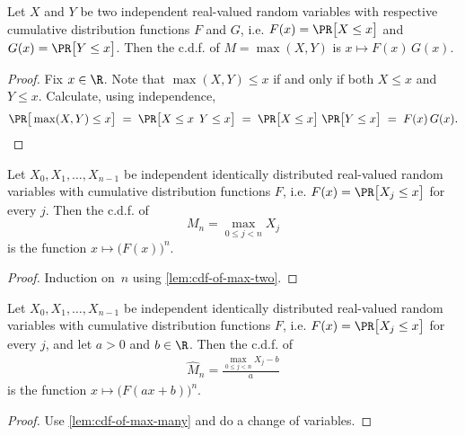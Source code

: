 \begin{lemma}
  \label{lem:cdf-of-max-two}
  Let $X$ and $Y$ be two independent real-valued random variables with respective
  cumulative distribution functions $F$ and $G$,
  i.e. $F(x) = \PR \big[ X \le x \big]$ and $G(x) = \PR \big[ Y \le x \big]$.
  Then the c.d.f. of $M = \max (X, Y)$ is $x \mapsto F(x) \, G(x)$.
\end{lemma}
\begin{proof}
  \uses{}
  Fix $x \in \R$. Note that $\max (X, Y) \le x$ if and only if both $X \le x$ and $Y \le x$.
  Calculate, using independence,
  \begin{align*}
  \PR\big[ \max (X, Y) \le x \big]
  \; = \; \PR\big[ X \le x \, \; Y \le x \big]
  \; = \; \PR\big[ X \le x \big] \; \PR\big[ Y \le x \big]
  \; = \; F(x) \, G(x) .
  \end{align*}
\end{proof}

\begin{lemma}
  \label{lem:cdf-of-max-many}
  Let $X_0, X_1, \ldots, X_{n-1}$ be independent identically distributed real-valued random variables
  with cumulative distribution functions $F$,
  i.e. $F(x) = \PR \big[ X_j \le x \big]$ for every $j$.
  Then the c.d.f. of \[ M_n = \max_{0 \le j < n} X_j\] is the function $x \mapsto \big(F(x)\big)^n$.
\end{lemma}
\begin{proof}
  Induction on~$n$ using \ref{lem:cdf-of-max-two}.
\end{proof}

\begin{lemma}
  \label{lem:cdf-of-affine-max-many}
  Let $X_0, X_1, \ldots, X_{n-1}$ be independent identically distributed real-valued random variables
  with cumulative distribution functions $F$,
  i.e. $F(x) = \PR \big[ X_j \le x \big]$ for every $j$,
  and let $a > 0$ and $b \in \R$.
  Then the c.d.f. of
  \begin{align*}
  \hat{M}_n = \frac{\max_{0 \le j < n} X_j - b}{a}
  \end{align*}
  is the function $x \mapsto \big(F(a x + b)\big)^n$.
\end{lemma}
\begin{proof}
  Use \ref{lem:cdf-of-max-many} and do a change of variables.
\end{proof}

